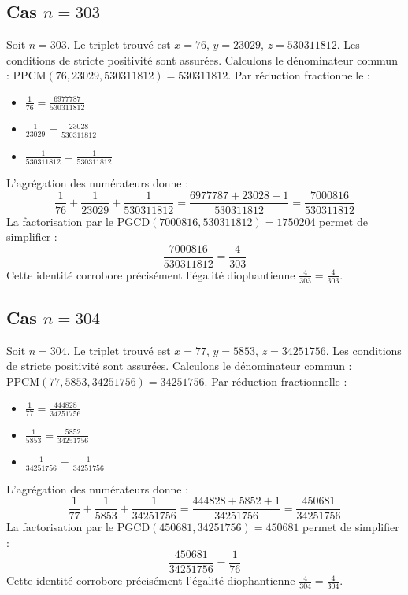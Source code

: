 \documentclass[11pt,a4paper]{article}
\begin{document}
\subsection{Cas $n = 303$}
Soit $n = 303$. Le triplet trouvé est $x = 76$, $y = 23029$, $z = 530311812$.
Les conditions de stricte positivité sont assurées.
Calculons le dénominateur commun : $\text{PPCM}(76, 23029, 530311812) = 530311812$.
Par réduction fractionnelle :
\begin{itemize}
    \item $\frac{1}{76} = \frac{6977787}{530311812}$
    \item $\frac{1}{23029} = \frac{23028}{530311812}$
    \item $\frac{1}{530311812} = \frac{1}{530311812}$
\end{itemize}
L'agrégation des numérateurs donne :
$$ \frac{1}{76} + \frac{1}{23029} + \frac{1}{530311812} = \frac{6977787 + 23028 + 1}{530311812} = \frac{7000816}{530311812} $$
La factorisation par le $\text{PGCD}(7000816, 530311812) = 1750204$ permet de simplifier :
$$ \frac{7000816}{530311812} = \frac{4}{303} $$
Cette identité corrobore précisément l'égalité diophantienne $\frac{4}{303} = \frac{4}{303}$.

\subsection{Cas $n = 304$}
Soit $n = 304$. Le triplet trouvé est $x = 77$, $y = 5853$, $z = 34251756$.
Les conditions de stricte positivité sont assurées.
Calculons le dénominateur commun : $\text{PPCM}(77, 5853, 34251756) = 34251756$.
Par réduction fractionnelle :
\begin{itemize}
    \item $\frac{1}{77} = \frac{444828}{34251756}$
    \item $\frac{1}{5853} = \frac{5852}{34251756}$
    \item $\frac{1}{34251756} = \frac{1}{34251756}$
\end{itemize}
L'agrégation des numérateurs donne :
$$ \frac{1}{77} + \frac{1}{5853} + \frac{1}{34251756} = \frac{444828 + 5852 + 1}{34251756} = \frac{450681}{34251756} $$
La factorisation par le $\text{PGCD}(450681, 34251756) = 450681$ permet de simplifier :
$$ \frac{450681}{34251756} = \frac{1}{76} $$
Cette identité corrobore précisément l'égalité diophantienne $\frac{4}{304} = \frac{4}{304}$.
\end{document}
